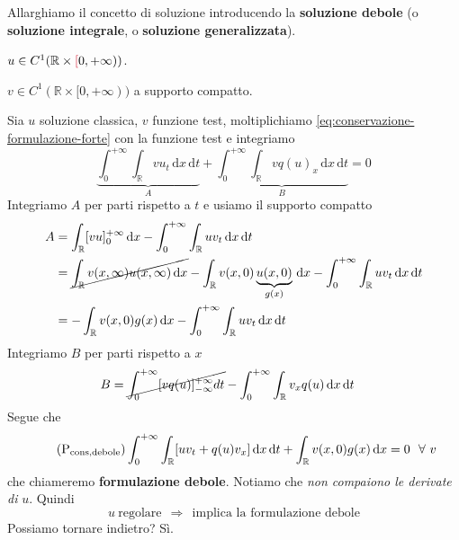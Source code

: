 \documentclass[10pt,a4paper,twoside,openright]{book}
\newcommand{\de}{\,\mathrm d}
\newcommand{\dx}{\de x}
\newcommand{\dt}{\de t}
\begin{document}
Allarghiamo il concetto di soluzione introducendo la \textbf{soluzione debole} (o \textbf{soluzione integrale}, o \textbf{soluzione generalizzata}).
\begin{definition}
 $u\in C^{1}(\mathbb{R} \times \textcolor[rgb]{0.82,0.01,0.11}{[} 0,+\infty))$.
\end{definition}
\begin{definition}
 $v\in C^{1}(\mathbb{R} \times [ 0,+\infty))$ a supporto compatto.
\end{definition}
Sia $u$ soluzione classica, $v$ funzione test, moltiplichiamo \eqref{eq:conservazione-formulazione-forte} con la funzione test e integriamo
\begin{equation*}
	\underbrace{\int ^{+\infty }_{0}\int _{\mathbb{R}} vu_{t} \dx\dt}_{A} +\underbrace{\int ^{+\infty }_{0}\int _{\mathbb{R}} vq(u)_{x} \dx\dt}_{B} =0
\end{equation*}
Integriamo $A$ per parti rispetto a $t$ e usiamo il supporto compatto
\begin{align*}
	A & =\int _{\mathbb{R}}[ vu]^{+\infty }_{0} \dx-\int ^{+\infty }_{0}\int _{\mathbb{R}} uv_{t} \dx\dt                  \\
	  & = \cancel{\int _{\mathbb{R}} v(x,\infty) u(x,\infty) \dx} -\int _{\mathbb{R}} v(x,0)\underbrace{u(x,0)}_{g(x)} \dx-\int ^{+\infty }_{0}\int _{\mathbb{R}} uv_{t} \dx\dt \\
	  & =-\int _{\mathbb{R}} v(x,0) g(x) \dx-\int ^{+\infty }_{0}\int _{\mathbb{R}} uv_{t} \dx\dt                       
\end{align*}
Integriamo $B$ per parti rispetto a $x$
\begin{align*}
	B & =\cancel{\int ^{+\infty }_{0}[ vq(u)]^{+\infty }_{-\infty } dt} -\int ^{+\infty }_{0}\int _{\mathbb{R}} v_{x} q(u) \dx\dt 
\end{align*}
Segue che
\begin{equation}
	\tag{P$_{\text{cons,debole}}$}
	\int ^{+\infty }_{0}\int _{\mathbb{R}}[ uv_{t} +q(u) v_{x}] \dx\dt+\int _{\mathbb{R}} v(x,0) g(x) \dx=0\ \ \forall \ v
	\label{eq:conservazione-formulazione-debole}
\end{equation}
che chiameremo \textbf{formulazione debole}. Notiamo che \textit{non compaiono le derivate di} $u$. Quindi
\begin{equation*}
	u\ \text{regolare} \ \ \Rightarrow \ \ \text{implica la formulazione debole}
\end{equation*}
Possiamo tornare indietro? Sì.
				
\end{document}
